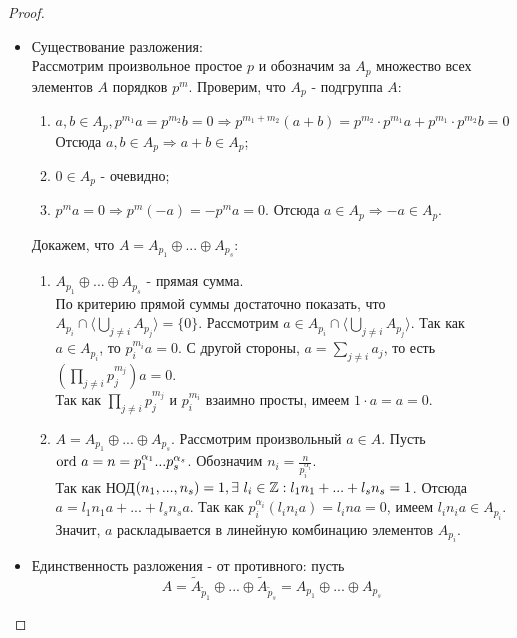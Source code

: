 \begin{proof}\tab
    \begin{itemize}
        \item Существование разложения:\\
        Рассмотрим произвольное простое $p$ и обозначим за $A_p$ множество всех элементов $A$ порядков $p^m$. Проверим, что $A_p$ - подгруппа $A$:
        \begin{enumerate}
            \item $a, b \in A_{p}, p^{m_1}a = p^{m_2}b = 0 \Longrightarrow p^{m_1 + m_2}(a+b) = p^{m_2}\cdot p^{m_1}a + p^{m_1}\cdot p^{m_2}b = 0$
            Отсюда $a, b \in A_p \Longrightarrow a+b \in A_p$;
            \item $0 \in A_p$ - очевидно;
            \item $p^ma = 0 \Longrightarrow p^m(-a) = -p^ma = 0$. Отсюда $a\in A_p \Longrightarrow -a \in A_p$.
        \end{enumerate}
        Докажем, что $A = A_{p_1} \oplus ... \oplus A_{p_s}$:
        \begin{enumerate}
            \item $A_{p_1} \oplus ... \oplus A_{p_s}$ - прямая сумма.\\
            По критерию прямой суммы достаточно показать, что $A_{p_i} \cap \langle \bigcup \limits_{j \neq i} A_{p_j} \rangle = \{0\}$. Рассмотрим $a \in A_{p_i} \cap \langle \bigcup \limits_{j \neq i} A_{p_j} \rangle$. Так как $a \in A_{p_i}$, то $p_i^{m_i}a = 0$. С другой стороны, $a = \sum \limits_{j \neq i} a_j$, то есть $(\prod \limits_{j \neq i} p_j^{m_j})a = 0$.\\
            Так как $\prod \limits_{j \neq i} p_j^{m_j}$ и $p_i^{m_i}$ взаимно просты, имеем $1 \cdot a = a = 0$.
            \item $A = A_{p_1} \oplus ... \oplus A_{p_s}$.
            Рассмотрим произвольный $a \in A$. Пусть $\textup{ord } a = n = p_1^{\alpha_1}...p_s^{\alpha_s}$. Обозначим $n_i = \frac{n}{p_i^{\alpha_i}}$.\\
            Так как НОД$(n_1,...,n_s) = 1, \exists\ l_i \in \mathbb{Z}: l_1n_1 + ... + l_sn_s = 1$.
            Отсюда $a = l_1n_1a + ... + l_sn_sa$. Так как $p_i^{\alpha_i}(l_in_ia) = l_ina = 0$, имеем $l_in_ia \in A_{p_i}$. Значит, $a$ раскладывается в линейную комбинацию элементов $A_{p_i}$.
        \end{enumerate} 
        \item Единственность разложения - от противного: пусть
        \[A = \tilde{A}_{\tilde{p}_1} \oplus ... \oplus \tilde{A}_{\tilde{p}_s} = A_{p_1} \oplus ... \oplus A_{p_s}\]

\end{itemize}
\end{proof}
